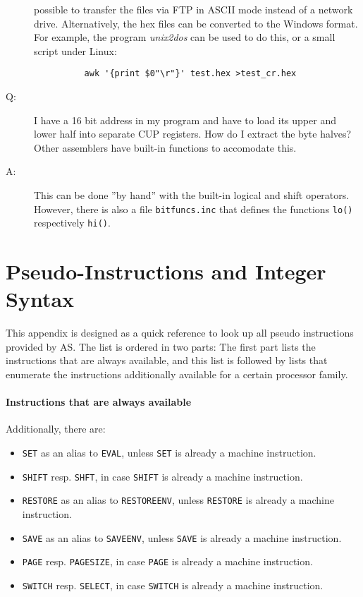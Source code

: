 \documentclass[12pt,twoside]{report}
\newcommand{\tty}[1]{{\tt #1}}
\newcommand{\asname}{{AS}}
\begin{document}
\begin{description}
{          possible to transfer the files via FTP in ASCII mode instead
          of a network drive.  Alternatively, the hex files can be
          converted to the Windows format.  For example, the program
          {\em unix2dos} can be used to do this, or a small script under
          Linux:
          \begin{verbatim}
          awk '{print $0"\r"}' test.hex >test_cr.hex
          \end{verbatim}}
\item[Q:]{I have a 16 bit address in my program and have to load its
          upper and lower half into separate CUP registers. How do I
          extract the byte halves? Other assemblers have built-in
          functions to accomodate this.}
\item[A:]{This can be done ''by hand'' with the built-in logical and
          shift operators.  However, there is also a file {\tt bitfuncs.inc}
          that defines the functions {\tt lo()} respectively {\tt hi()}.}
\end{description}


\cleardoublepage
\chapter{Pseudo-Instructions and Integer Syntax}
\label{SectPseudoInst}

This appendix is designed as a quick reference to look up all pseudo
instructions provided by \asname{}.  The list is ordered in two parts: The
first part lists the instructions that are always available, and this
list is followed by lists that enumerate the instructions
additionally available for a certain processor family.

\subsubsection{Instructions that are always available}

Additionally, there are:
\begin{itemize}
\item{\tty{SET} as an alias to \tty{EVAL}, unless \tty{SET} is already a machine
      instruction.}
\item{\tty{SHIFT} resp. \tty{SHFT}, in case \tty{SHIFT} is already a machine
      instruction.}
\item{\tty{RESTORE} as an alias to \tty{RESTOREENV}, unless \tty{RESTORE} is already a machine
      instruction.}
\item{\tty{SAVE} as an alias to \tty{SAVEENV}, unless \tty{SAVE} is already a machine
      instruction.}
\item{\tty{PAGE} resp. \tty{PAGESIZE}, in case \tty{PAGE} is already a machine
      instruction.}
\item{\tty{SWITCH} resp. \tty{SELECT}, in case \tty{SWITCH} is already a machine
      instruction.}
\end{itemize}
\end{document}
